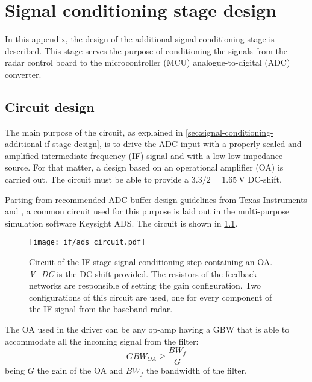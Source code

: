 \chapter{Signal conditioning stage design} \label{app:if}

In this appendix, the design of the additional signal conditioning stage is described. This stage serves the purpose of conditioning the signals from the radar control board to the microcontroller (MCU) analogue-to-digital (ADC) converter.

\section{Circuit design}

The main purpose of the circuit, as explained in \cref{sec:signal-conditioning-additional-if-stage-design}, is to drive the ADC input with a properly scaled and amplified intermediate frequency (IF) signal and with a low-low impedance source. For that matter, a design based on an operational amplifier (OA) is carried out. The circuit must be able to provide a $3.3/2 = \SI{1.65}{\volt}$ DC-shift.

Parting from recommended ADC buffer design guidelines from Texas Instruments \cite[p.~17]{TexasInstruments2022} and \cite{Franco2014}, a common circuit used for this purpose is laid out in the multi-purpose simulation software Keysight ADS. The circuit is shown in \cref{fig:if_cir}.

\begin{figure}[h]
	\centering
	\texttt{[image: if/ads\_circuit.pdf]}
	\caption{Circuit of the IF stage signal conditioning step containing an OA. \textit{V\_DC} is the DC-shift provided. The resistors of the feedback networks are responsible of setting the gain configuration. Two configurations of this circuit are used, one for every component of the IF signal from the baseband radar.}
	\label{fig:if_cir}
\end{figure}

The OA used in the driver can be any op-amp having a GBW that is able to accommodate all the incoming signal from the filter:
\begin{equation}
	GBW_{OA} \ge \frac{BW_{f}}{G}
\end{equation}
being $G$ the gain of the OA and $BW_{f}$ the bandwidth of the filter.


